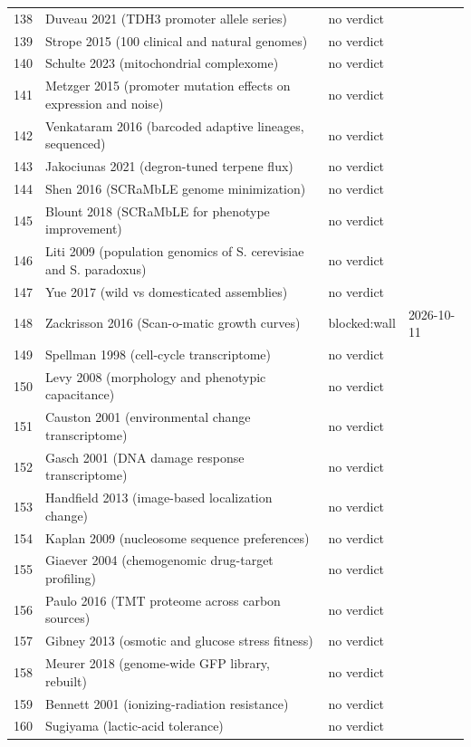 \begin{longtable}{@{}r L{88mm} L{40mm} L{24mm}@{}}
138 & Duveau 2021 (TDH3 promoter allele series) & no verdict &  \\
139 & Strope 2015 (100 clinical and natural genomes) & no verdict &  \\
140 & Schulte 2023 (mitochondrial complexome) & no verdict &  \\
141 & Metzger 2015 (promoter mutation effects on expression and noise) & no verdict &  \\
142 & Venkataram 2016 (barcoded adaptive lineages, sequenced) & no verdict &  \\
143 & Jakociunas 2021 (degron-tuned terpene flux) & no verdict &  \\
144 & Shen 2016 (SCRaMbLE genome minimization) & no verdict &  \\
145 & Blount 2018 (SCRaMbLE for phenotype improvement) & no verdict &  \\
146 & Liti 2009 (population genomics of S. cerevisiae and S. paradoxus) & no verdict &  \\
147 & Yue 2017 (wild vs domesticated assemblies) & no verdict &  \\
148 & Zackrisson 2016 (Scan-o-matic growth curves) & blocked:wall & 2026-10-11 \\
149 & Spellman 1998 (cell-cycle transcriptome) & no verdict &  \\
150 & Levy 2008 (morphology and phenotypic capacitance) & no verdict &  \\
151 & Causton 2001 (environmental change transcriptome) & no verdict &  \\
152 & Gasch 2001 (DNA damage response transcriptome) & no verdict &  \\
153 & Handfield 2013 (image-based localization change) & no verdict &  \\
154 & Kaplan 2009 (nucleosome sequence preferences) & no verdict &  \\
155 & Giaever 2004 (chemogenomic drug-target profiling) & no verdict &  \\
156 & Paulo 2016 (TMT proteome across carbon sources) & no verdict &  \\
157 & Gibney 2013 (osmotic and glucose stress fitness) & no verdict &  \\
158 & Meurer 2018 (genome-wide GFP library, rebuilt) & no verdict &  \\
159 & Bennett 2001 (ionizing-radiation resistance) & no verdict &  \\
160 & Sugiyama (lactic-acid tolerance) & no verdict &  \\

\end{longtable}
